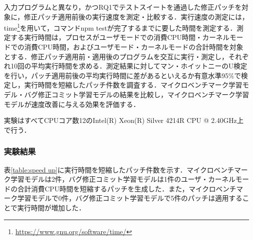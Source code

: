 \documentclass[submit,ses,noauthor]{ipsj}
\begin{document}
入力プログラムと異なり，かつRQ1でテストスイートを通過した修正パッチを対象に，修正パッチ適用前後の実行速度を測定・比較する．実行速度の測定には，time\footnote{\url{https://www.gnu.org/software/time/}}を用いて，コマンドnpm testが完了するまでに要した時間を測定する．測定する実行時間は，プロセスがユーザモードでの消費CPU時間・カーネルモードでの消費CPU時間，およびユーザモード・カーネルモードの合計時間を対象とする．修正パッチ適用前・適用後のプログラムを交互に実行・測定し，それぞれ10回の平均実行時間を求める．測定結果に対してマン・ホイットニーのU検定を行い，パッチ適用前後の平均実行時間に差があるといえるか有意水準95\%で検定し，実行時間を短縮したパッチ件数を調査する．マイクロベンチマーク学習モデル・バグ修正コミット学習モデルの結果を比較し，マイクロベンチマーク学習モデルが速度改善に与える効果を評価する．

実験はすべてCPUコア数12のIntel(R) Xeon(R) Silver 4214R CPU @ 2.40GHz上で行う．

\subsubsection{実験結果}

表\ref{table:speed up}に実行時間を短縮したパッチ件数を示す．マイクロベンチマーク学習モデルは2件，バグ修正コミット学習モデルは1件のユーザ・カーネルモードの合計消費CPU時間を短縮するパッチを生成した．また，マイクロベンチマーク学習モデルで0件，バグ修正コミット学習モデルで5件のパッチは適用することで実行時間が増加した．


\begin{table}[t]
  \caption{RQ2：実行時間を短縮したパッチ件数}
  \label{table:speed up}
  \centering
\end{table}
\end{document}
